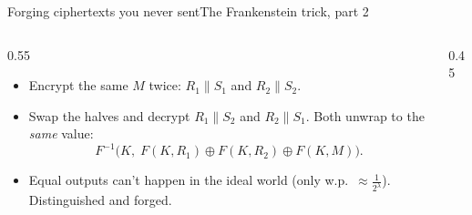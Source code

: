 \ifdefined\PRESENTATION\else\PassOptionsToClass{handout}{beamer}\fi\documentclass[aspectratio=169, lualatex]{beamer}
\begin{document}
\begin{frame}{Forging ciphertexts you never sent}{The Frankenstein trick, part 2}
	\begin{columns}[c]
		\begin{column}{0.55\textwidth}
			\begin{itemize}
				\item Encrypt the same $M$ twice: $R_1\|S_1$ and $R_2\|S_2$.
				\item Swap the halves and decrypt $R_1\|S_2$ and $R_2\|S_1$. Both unwrap to the \emph{same} value:
				      \[ F^{-1}\big(K,\; F(K, R_1) \oplus F(K, R_2) \oplus F(K, M)\big). \]
				\item Equal outputs can't happen in the ideal world (only w.p.\ $\approx \frac{1}{2^\lambda}$). Distinguished and forged.
			\end{itemize}
		\end{column}
		\begin{column}{0.45\textwidth}
		\end{column}
	\end{columns}
\end{frame}
\end{document}
